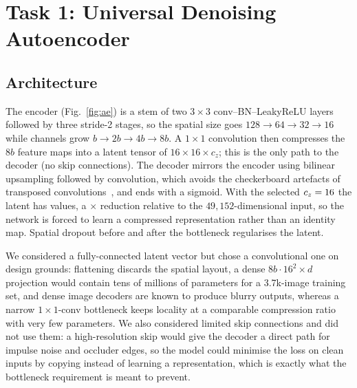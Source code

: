 \documentclass[conference]{IEEEtran}
\begin{document}
\section{Task 1: Universal Denoising Autoencoder}
\subsection{Architecture}
The encoder (Fig.~\ref{fig:ae}) is a stem of two $3\times3$ conv--BN--LeakyReLU layers followed by three stride-2 stages, so the spatial size goes $128\to64\to32\to16$ while channels grow $b\to2b\to4b\to8b$. A $1\times1$ convolution then compresses the $8b$ feature maps into a latent tensor of $16\times16\times c_z$; this is the only path to the decoder (no skip connections). The decoder mirrors the encoder using bilinear upsampling followed by convolution, which avoids the checkerboard artefacts of transposed convolutions~\cite{odena2016deconv}, and ends with a sigmoid. With the selected $c_z=16$ the latent has \TONELATDIM{} values, a \TONECOMPRESS$\times$ reduction relative to the $49{,}152$-dimensional input, so the network is forced to learn a compressed representation rather than an identity map. Spatial dropout before and after the bottleneck regularises the latent.

We considered a fully-connected latent vector but chose a convolutional one on design grounds: flattening discards the spatial layout, a dense $8b\cdot16^2\times d$ projection would contain tens of millions of parameters for a 3.7k-image training set, and dense image decoders are known to produce blurry outputs, whereas a narrow $1\times1$-conv bottleneck keeps locality at a comparable compression ratio with very few parameters. We also considered limited skip connections and did not use them: a high-resolution skip would give the decoder a direct path for impulse noise and occluder edges, so the model could minimise the loss on clean inputs by copying instead of learning a representation, which is exactly what the bottleneck requirement is meant to prevent.
\end{document}
